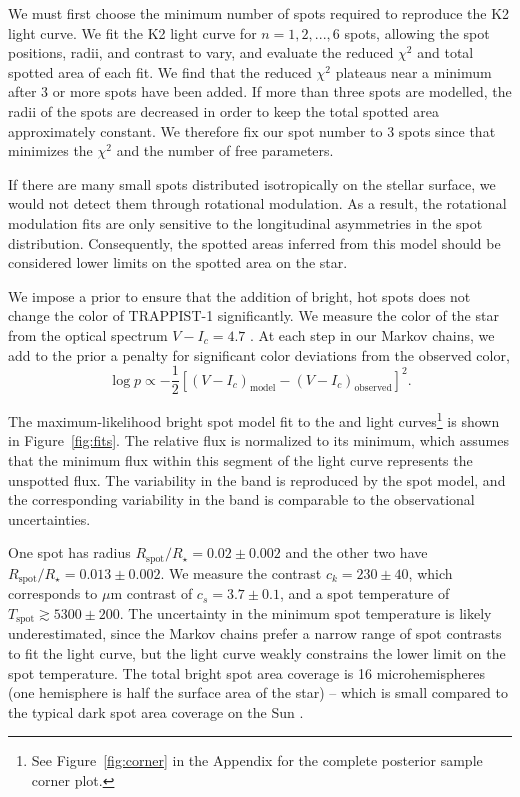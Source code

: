 
We must first choose the minimum number of spots required to reproduce the K2 light curve. We fit the K2 light curve for $n={1, 2, ..., 6}$ spots, allowing the spot positions, radii, and contrast to vary, and evaluate the reduced $\chi^2$ and total spotted area of each fit. We find that the reduced $\chi^2$ plateaus near a minimum after 3 or more spots have been added. If more than three spots are modelled, the radii of the spots are decreased in order to keep the total spotted area approximately constant. We therefore fix our spot number to 3 spots since that minimizes the $\chi^2$ and the number of free parameters. 

If there are many small spots distributed isotropically on the stellar surface, we would not detect them through rotational modulation. As a result, the rotational modulation fits are only sensitive to the longitudinal asymmetries in the spot distribution. Consequently, the spotted areas inferred from this model should be considered lower limits on the spotted area on the star.

We impose a prior to ensure that the addition of bright, hot spots does not change the color of TRAPPIST-1 significantly. We measure the color of the star from the optical spectrum $V-I_c = 4.7$ \citep{Burgasser2015}. At each step in our Markov chains, we add to the prior a penalty for significant color deviations from the observed color, 
\begin{equation*}
\log p \propto -\frac{1}{2}\left[ (V-I_c)_\mathrm{model} - (V-I_c)_\mathrm{observed} \right]^2.
\end{equation*}


The maximum-likelihood bright spot model fit to the \kepler and \spitzer light curves\footnote{See Figure~\ref{fig:corner} in the Appendix for the complete posterior sample corner plot.} is shown in Figure~\ref{fig:fits}. The relative flux is normalized to its minimum, which assumes that the minimum flux within this segment of the light curve represents the unspotted flux. The variability in the \kepler band is reproduced by the spot model, and the corresponding variability in the \spitzer band is comparable to the observational uncertainties. 

One spot has radius $R_\mathrm{spot}/R_\star = 0.02 \pm 0.002$ and the other two have $R_\mathrm{spot}/R_\star = 0.013 \pm 0.002$. We measure the \kepler contrast $c_k = 230 \pm 40$, which corresponds to  $\mu$m contrast of $c_s = 3.7 \pm 0.1$, and a spot temperature of $T_\mathrm{spot} \gtrsim 5300 \pm 200$. The uncertainty in the minimum spot temperature is likely underestimated, since the Markov chains prefer a narrow range of spot contrasts to fit the \kepler light curve, but the \spitzer light curve weakly constrains the lower limit on the spot temperature. The total bright spot area coverage is 16 microhemispheres (one hemisphere is half the surface area of the star) -- which is small compared to the typical dark spot area coverage on the Sun \citep{Morris2017a}. 

